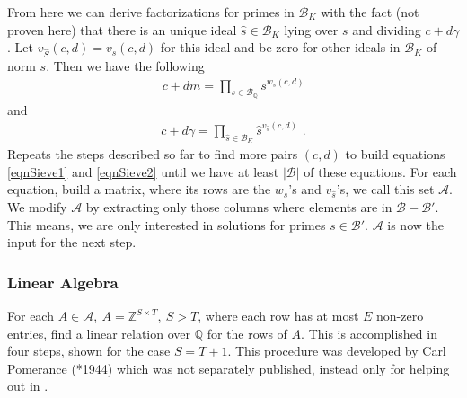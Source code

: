 \documentclass[paper=a4, fontsize=11pt]{scrartcl} %
\numberwithin{equation}{section} %
\numberwithin{figure}{section} %
\numberwithin{table}{section} %
\begin{document}
From here we can derive factorizations for primes in $\mathcal{B}_K$ with the fact (not proven here) that there is an unique ideal $\hat{s}\in\mathcal{B}_K$ lying over $s$ and dividing $c+d\gamma$. Let $v_{\hat{S}}(c,d) = v_s(c,d)$ for this ideal and be zero for other ideals in $\mathcal{B}_K$ of norm $s$. Then we have the following
\begin{eqnarray}
\label{eqnSieve1}
c+dm = \prod_{s\in\mathcal{B}_\mathbb{Q}}s^{w_s(c,d)}
\end{eqnarray}
and
\begin{eqnarray}
\label{eqnSieve2}
c+d\gamma = \prod_{\hat{s}\in\mathcal{B}_K}\hat{s}^{v_{\hat{s}}(c,d)}
\text{ .}
\end{eqnarray}
Repeats the steps described so far to find more pairs $(c,d)$ to build equations \ref{eqnSieve1} and \ref{eqnSieve2} until we have at least $|\mathcal{B}|$ of these equations. For each equation, build a matrix, where its rows are the $w_s$'s and $v_{\hat{s}}$'s, we call this set $\mathcal{A}$. We modify $\mathcal{A}$ by extracting only those columns where elements are in $\mathcal{B}-\mathcal{B}'$. This means, we are only interested in solutions for primes $s\in\mathcal{B}'$. $\mathcal{A}$ is now the input for the next step.

\subsubsection{Linear Algebra}
For each $A \in \mathcal{A},\ A = \mathbb{Z}^{S\times T},\ S > T$, where each row has at most $E$ non-zero entries, find a linear relation over $\mathbb{Q}$ for the rows of $A$. This is accomplished in four steps, shown for the case $S=T+1$. This procedure was developed by Carl Pomerance (*1944) which was not separately published, instead only for helping out in \citep{gordon1993discrete}.
\end{document}
